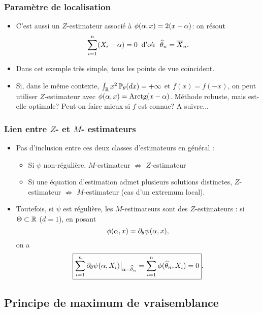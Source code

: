 \begin{frame}
\frametitle{Paramètre de localisation}
\begin{itemize}
\item C'est \alert{aussi} un $Z$-estimateur associé à $\phi(\alpha,x)=2(x-\alpha)$: on résout
$$\sum_{i = 1}^n (X_i - \alpha)=0\;\;\text{d'où}\;\;\operatorname{\widehat \theta_{\mathnormal{n}}} = \overline{X}_n.$$
\item Dans cet \alert{exemple très simple},
tous les points de vue coïncident.
%
\item Si, dans le même contexte,
$\int_{\operatorname{{\mathbb R}}}x^2\operatorname{{\mathbb P}}_\theta(dx)=+\infty$ et $f(x)=f(-x)$, on peut
utiliser $Z$-estimateur avec $\phi(\alpha,x)={\rm Arctg}(x-\alpha)$. Méthode
robuste, mais est-elle optimale? Peut-on faire mieux \alert{si $f$ est connue? A suivre...}
\end{itemize}
\end{frame}

\begin{frame}
\frametitle{Lien entre $Z$- et $M$- estimateurs}
\begin{itemize}
\item \alert{Pas d'inclusion} entre ces deux classes d'estimateurs \alert{en général} :
\begin{itemize}
\item Si $\psi$ non-régulière, $M$-estimateur $\nRightarrow$ $Z$-estimateur
\item Si une équation d'estimation admet plusieurs solutions distinctes, $Z$-estimateur $\nRightarrow$ $M$-estimateur (cas d'un extremum local).
\end{itemize}
\item Toutefois, si $\psi$ \alert{est régulière}, les $M$-estimateurs \alert{sont} des $Z$-estimateurs : si $\Theta \subset \operatorname{{\mathbb R}}$ ($d=1$), en posant
$$\phi(\alpha,x) = \partial_\theta\psi(\alpha,x),$$
on a
$$\boxed{\sum_{i = 1}^n \partial_{\theta} \psi(\alpha, X_i)\big|_{\alpha = \operatorname{\widehat \theta_{\mathnormal{n}}}}
= \sum_{i = 1}^n \phi(\operatorname{\widehat \theta_{\mathnormal{n}}}, X_i)=0}.$$
\end{itemize}
\end{frame}

\subsection{Principe de maximum de vraisemblance}

